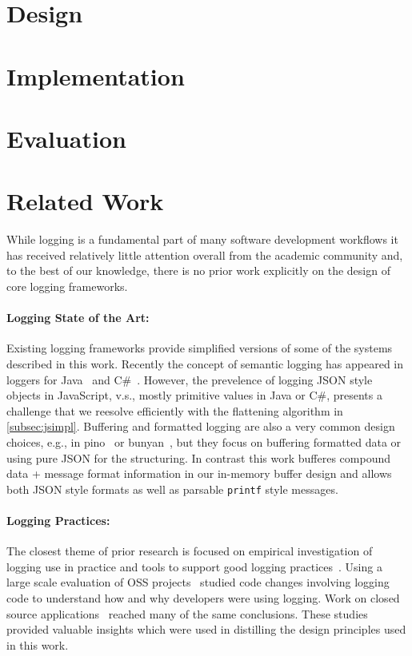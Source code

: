 \documentclass[sigplan,10pt,screen]{acmart}
\begin{document}
\section{Design}
\label{sec:design}


\section{Implementation}
\label{sec:implementation}


\section{Evaluation}
\label{sec:evaluation}


\section{Related Work}
\label{sec:relwork}
While logging is a fundamental part of many software development workflows it has 
received relatively little attention overall from the academic community and, to the 
best of our knowledge, there is no prior work explicitly on the design of core 
logging frameworks. 

\paragraph{Logging State of the Art:}
\noindent
Existing logging frameworks provide simplified versions of some of the systems described 
in this work. Recently the concept of semantic logging has appeared in loggers for 
Java~\cite{log4j} and C\#~\cite{serilog}. However, the prevelence of logging JSON 
style objects in JavaScript, v.s., mostly primitive values in Java or C\#, presents 
a challenge that we reesolve efficiently with the flattening algorithm in \autoref{subsec:jsimpl}. 
Buffering and formatted logging are also a very common design choices, e.g., in pino~\cite{pino} 
or bunyan~\cite{bunyan}, but they focus on buffering formatted data or using pure 
JSON for the structuring. In contrast this work bufferes compound data + message format 
information in our in-memory buffer design and allows both JSON style formats as well as 
parsable \texttt{printf} style messages. 

\paragraph{Logging Practices:}
\noindent
The closest theme of prior research is focused on empirical investigation of logging 
use in practice and tools to support good logging practices~\cite{logstudy,logstudy2}. 
Using a large scale evaluation of OSS projects~\cite{logstudy} studied code changes 
involving logging code to understand how and why developers were using logging. 
Work on closed source applications~\cite{logstudy2} reached many of the same conclusions. 
These studies provided valuable insights which were used in distilling the design 
principles used in this work.
\end{document}
